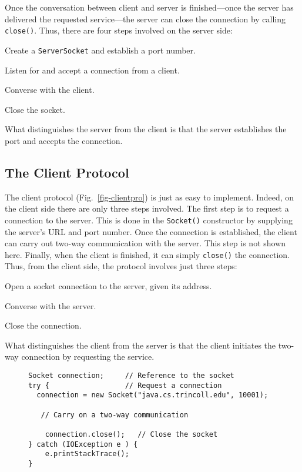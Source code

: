 Once the conversation between client and server is finished---once
the server has delivered the requested service---the server can close
the connection by calling {\tt close()}. Thus, there are four steps
involved on the server side:

\begin{BL}
\item  Create a {\tt ServerSocket} and establish a port number.
\item  Listen for and accept a connection from a client.
\item  Converse with the client.
\item  Close the socket.
\end{BL}

\noindent What distinguishes the server from the client is that
the server establishes the port and accepts the connection.



\subsection{The Client Protocol}
\noindent The client protocol (Fig.~\ref{fig-clientpro}) is just as easy to
implement.   Indeed, on the client side there are only three steps involved.
The first step is to request a connection to the server.  This is done
in the {\tt Socket()} constructor by supplying the server's URL and
port number.  Once the connection is established, the client can carry
out two-way communication with the server.  This step is not shown
here.  Finally, when the client is finished, it can simply {\tt close()}
the connection.  Thus, from the client side, the protocol involves just
three steps:

\begin{BL}
\item  Open a socket connection to the server, given its address.
\item  Converse with the server.
\item  Close the connection.
\end{BL}

\noindent What distinguishes the client from the server is that the
client initiates the two-way connection by requesting the service.

\begin{figure}[thb]
\jjjprogstart
\begin{jjjlisting}
\begin{lstlisting}
Socket connection;     // Reference to the socket
try {                  // Request a connection
  connection = new Socket("java.cs.trincoll.edu", 10001);

   // Carry on a two-way communication

    connection.close();   // Close the socket
} catch (IOException e ) {
    e.printStackTrace();
}
\end{lstlisting}
\end{jjjlisting}
\end{figure}

